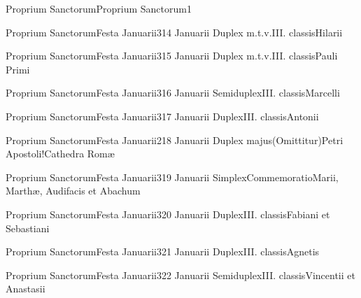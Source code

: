 \documentclass[psalterium-feriale.tex]{subfiles}
\begin{document}

	{Proprium Sanctorum}{Proprium Sanctorum}{1}{}{}{}{}{}{}



	{Proprium Sanctorum}{Festa Januarii}{3}{14 Januarii}
	{Duplex m.t.v.}{III. classis}{Hilarii}
	{}
	{}
\COPOcRubric
	
	{Proprium Sanctorum}{Festa Januarii}{3}{15 Januarii}
	{Duplex m.t.v.}{III. classis}{Pauli Primi}
	{}
	{}
\COPObRubric

	{Proprium Sanctorum}{Festa Januarii}{3}{16 Januarii}
	{Semiduplex}{III. classis}{Marcelli}
	{}
	{}
\COPOaRubric
	
	{Proprium Sanctorum}{Festa Januarii}{3}{17 Januarii}
	{Duplex}{III. classis}{Antonii}
	{}
	{}
\COPObRubric

	{Proprium Sanctorum}{Festa Januarii}{2}{18 Januarii}
	{Duplex majus}{(Omittitur)}{Petri Apostoli!Cathedra Romæ}
	{}
	{}
\psalmodiapropria

	{Proprium Sanctorum}{Festa Januarii}{3}{19 Januarii}
	{Simplex}{Commemoratio}{Marii, Marthæ, Audifacis et Abachum}
	{}
	{}
\PMEXaRubric

	{Proprium Sanctorum}{Festa Januarii}{3}{20 Januarii}
	{Duplex}{III. classis}{Fabiani et Sebastiani}
	{}
	{}
\PMEXbRubric

	{Proprium Sanctorum}{Festa Januarii}{3}{21 Januarii}
	{Duplex}{III. classis}{Agnetis}
	{}
	{}
\psalmodiapropria

	{Proprium Sanctorum}{Festa Januarii}{3}{22 Januarii}
	{Semiduplex}{III. classis}{Vincentii et Anastasii}
	{}
	{}
\PMEXaRubric
\end{document}
